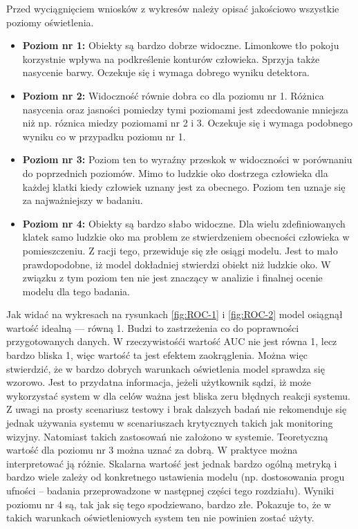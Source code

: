 Przed wyciągnięciem wniosków z wykresów należy opisać jakościowo wszystkie poziomy oświetlenia. 
\begin{itemize}
    \item \textbf{Poziom nr 1:} Obiekty są bardzo dobrze widoczne. Limonkowe tło pokoju korzystnie wpływa na podkreślenie konturów człowieka. Sprzyja także nasycenie barwy. Oczekuje się i wymaga dobrego wyniku detektora. 
    \item \textbf{Poziom nr 2:} Widoczność równie dobra co dla poziomu nr 1. Różnica nasycenia oraz jasności pomiedzy tymi poziomami jest zdecdowanie mniejsza niż np. róznica miedzy poziomami nr 2 i 3. Oczekuje się i wymaga podobnego wyniku co w przypadku poziomu nr 1.
    \item \textbf{Poziom nr 3:} Poziom ten to wyraźny przeskok w widoczności w porównaniu do poprzednich poziomów. Mimo to ludzkie oko dostrzega człowieka dla każdej klatki kiedy człowiek uznany jest za obecnego. Poziom ten uznaje się za najważniejszy w badaniu.
    \item \textbf{Poziom nr 4:} Obiekty są bardzo słabo widoczne. Dla wielu zdefiniowanych klatek samo ludzkie oko ma problem ze stwierdzeniem obecności człowieka w pomieszczeniu. Z racji tego, przewiduje się złe osiągi modelu. Jest to mało prawdopodobne, iż model dokładniej stwierdzi obiekt niż ludzkie oko. W związku z tym poziom ten nie jest znaczący w analizie i finalnej ocenie modelu dla tego badania. 
\end{itemize}

Jak widać na wykresach na rysunkach \ref{fig:ROC-1} i \ref{fig:ROC-2} model osiągnął wartość idealną --- równą 1. Budzi to zastrzeżenia co do poprawności przygotowanych danych. W rzeczywistośći wartość AUC nie jest równa 1, lecz bardzo bliska 1, więc wartość ta jest efektem zaokrąglenia. Można więc stwierdzić, że w bardzo dobrych warunkach oświetlenia model sprawdza się wzorowo. Jest to przydatna informacja, jeżeli użytkownik sądzi, iż może wykorzystać system w dla celów ważna jest bliska zeru błędnych reakcji systemu. Z uwagi na prosty scenariusz testowy i brak dalszych badań nie rekomenduje się jednak używania systemu w scenariuszach krytycznych takich jak monitoring wizyjny. Natomiast takich zastosowań nie założono w systemie. Teoretyczną wartość dla poziomu nr 3 można uznać za dobrą. W praktyce można interpretować ją różnie. Skalarna wartość jest jednak bardzo ogólną metryką i bardzo wiele zależy od konkretnego ustawienia modelu (np. dostosowania progu ufności -- badania przeprowadzone w następnej części tego rozdziału). Wyniki poziomu nr 4 są, tak jak się tego spodziewano, bardzo złe. Pokazuje to, że w takich warunkach oświetleniowych system ten nie powinien zostać użyty. 

